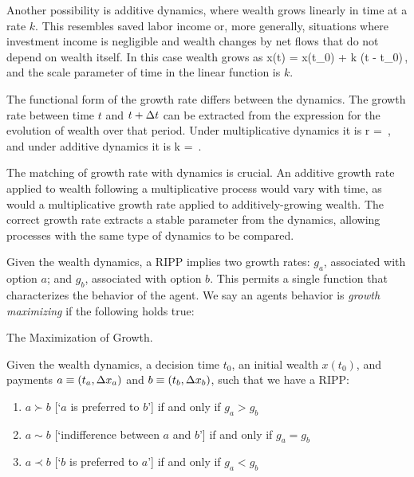 Another possibility is additive dynamics, where wealth grows linearly in time at a rate $k$. This resembles saved labor income or, more generally, situations where investment income is negligible and wealth changes by net flows that do not depend on wealth itself. In this case wealth grows as
%
\be
x\left(t\right) = x\left(t_0\right) + k \left(t - t_0\right)\,,
\ee
%
and the scale parameter of time in the linear function is $k$.

The functional form of the growth rate differs between the dynamics. The growth rate between time $t$ and $t+\Delta t$ can be extracted from the expression for the evolution of wealth over that period. Under multiplicative dynamics it is
%
\be
r = \,,
\ee
%
and under additive dynamics it is
%
\be
k = \,.
\ee
%

The matching of growth rate with dynamics is crucial. An additive growth rate applied to wealth following a multiplicative process would vary with time, as would a multiplicative growth rate applied to additively-growing wealth. The correct growth rate extracts a stable parameter from the dynamics, allowing processes with the same type of dynamics to be compared.

Given the wealth dynamics, a RIPP implies two growth rates: $g_a$, associated with option $a$; and $g_b$, associated with option $b$. This permits a single function that characterizes the behavior of the agent. We say an agents behavior is \textit{growth maximizing} if the following holds true:

\begin{definition}{The Maximization of Growth.}

Given the wealth dynamics, a decision time $t_0$, an initial wealth $x\left(t_0\right)$, and payments $a\equiv\left(t_a,\Delta x_a\right)$ and $b\equiv\left(t_b,\Delta x_b\right)$, such that we have a RIPP:
%
\begin{enumerate}
\item $a \succ b$ [`$a$ is preferred to $b$'] if and only if $g_a > g_b$ 
\item $a\sim b$ [`indifference between $a$ and $b$'] if and only if $g_a = g_b$
\item $a \prec b$ [`$b$ is preferred to $a$'] if and only if $g_a < g_b$
\end{enumerate}
%
\label{ax:ax1}
\end{definition}

